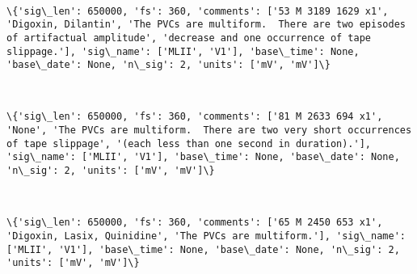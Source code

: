 \documentclass[11pt]{article}
\begin{document}
    \begin{center}
    \end{center}
    { \hspace*{\fill} \\}
    
    \begin{Verbatim}[commandchars=\\\{\}]
\{'sig\_len': 650000, 'fs': 360, 'comments': ['53 M 3189 1629 x1', 'Digoxin, Dilantin', 'The PVCs are multiform.  There are two episodes of artifactual amplitude', 'decrease and one occurrence of tape slippage.'], 'sig\_name': ['MLII', 'V1'], 'base\_time': None, 'base\_date': None, 'n\_sig': 2, 'units': ['mV', 'mV']\}

    \end{Verbatim}

    \begin{center}
    \end{center}
    { \hspace*{\fill} \\}
    
    \begin{Verbatim}[commandchars=\\\{\}]
\{'sig\_len': 650000, 'fs': 360, 'comments': ['81 M 2633 694 x1', 'None', 'The PVCs are multiform.  There are two very short occurrences of tape slippage', '(each less than one second in duration).'], 'sig\_name': ['MLII', 'V1'], 'base\_time': None, 'base\_date': None, 'n\_sig': 2, 'units': ['mV', 'mV']\}

    \end{Verbatim}

    \begin{center}
    \end{center}
    { \hspace*{\fill} \\}
    
    \begin{Verbatim}[commandchars=\\\{\}]
\{'sig\_len': 650000, 'fs': 360, 'comments': ['65 M 2450 653 x1', 'Digoxin, Lasix, Quinidine', 'The PVCs are multiform.'], 'sig\_name': ['MLII', 'V1'], 'base\_time': None, 'base\_date': None, 'n\_sig': 2, 'units': ['mV', 'mV']\}

    \end{Verbatim}
\end{document}
